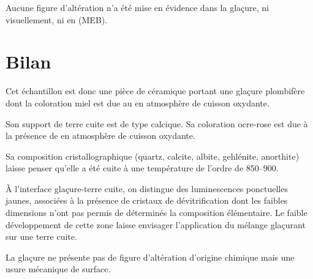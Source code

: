 Aucune figure d'altération n'a été mise en évidence dans la glaçure, 
ni visuellement, ni en \MEB[ie] (MEB).


\section{Bilan}

Cet échantillon est donc une pièce de céramique portant une glaçure 
plombifère dont la coloration miel est due au  en atmosphère 
de cuisson oxydante.

Son support de terre cuite est de type calcique. Sa coloration 
ocre-rose est due à la présence de  en atmosphère de 
cuisson oxydante.

Sa composition cristallographique (quartz, calcite, albite, gehlénite, 
anorthite) laisse penser qu'elle a été cuite à une température de 
l'ordre de \SIrange[range-phrase=\ à\ ]{850}{900}{\degC}.

À l'interface glaçure-terre cuite, on distingue des luminescences 
ponctuelles jaunes, associées à la présence de cristaux de 
dévitrification dont les faibles dimensions n'ont pas permis de 
déterminés la composition élémentaire. Le faible développement de 
cette zone laisse envisager l'application du mélange glaçurant sur 
une terre cuite.

La glaçure ne présente pas de figure d'altération d'origine chimique 
mais une usure mécanique de surface.
